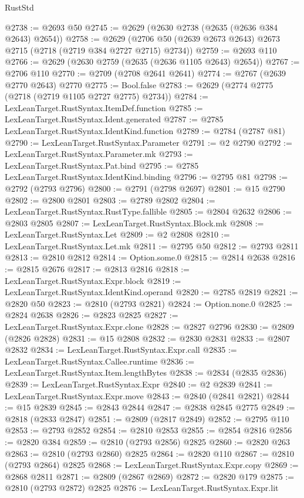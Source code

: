 \begin{lexlean}{RustStd}
\begin{coremodule}
{\begin{coremodule}
{{{{{{{{{{{{{{{{{{{{{{{{{{{{{{{{{@2738 := @2693 @50
@2745 := @2629 (@2630 @2738 (@2635 (@2636 @384 @2643) @2654))
@2758 := @2629 (@2706 @50 (@2639 @2673 @2643) @2673 @2715 (@2718 (@2719 @384 @2727 @2715) @2734))
@2759 := @2693 @110
@2766 := @2629 (@2630 @2759 (@2635 (@2636 @1105 @2643) @2654))
@2767 := @2706 @110
@2770 := @2709 (@2708 @2641 @2641)
@2774 := @2767 (@2639 @2770 @2643) @2770
@2775 := Bool.false
@2783 := @2629 (@2774 @2775 (@2718 (@2719 @1105 @2727 @2775) @2734))
@2784 := LexLeanTarget.RustSyntax.ItemDef.function
@2785 := LexLeanTarget.RustSyntax.Ident.generated
@2787 := @2785 LexLeanTarget.RustSyntax.IdentKind.function
@2789 := @2784 (@2787 @81)
@2790 := LexLeanTarget.RustSyntax.Parameter
@2791 := @2 @2790
@2792 := LexLeanTarget.RustSyntax.Parameter.mk
@2793 := LexLeanTarget.RustSyntax.Pat.bind
@2795 := @2785 LexLeanTarget.RustSyntax.IdentKind.binding
@2796 := @2795 @81
@2798 := @2792 (@2793 @2796)
@2800 := @2791 (@2798 @2697)
@2801 := @15 @2790
@2802 := @2800 @2801
@2803 := @2789 @2802
@2804 := LexLeanTarget.RustSyntax.RustType.fallible
@2805 := @2804 @2632
@2806 := @2803 @2805
@2807 := LexLeanTarget.RustSyntax.Block.mk
@2808 := LexLeanTarget.RustSyntax.Let
@2809 := @2 @2808
@2810 := LexLeanTarget.RustSyntax.Let.mk
@2811 := @2795 @50
@2812 := @2793 @2811
@2813 := @2810 @2812
@2814 := Option.some.{0}
@2815 := @2814 @2638
@2816 := @2815 @2676
@2817 := @2813 @2816
@2818 := LexLeanTarget.RustSyntax.Expr.block
@2819 := LexLeanTarget.RustSyntax.IdentKind.operand
@2820 := @2785 @2819
@2821 := @2820 @50
@2823 := @2810 (@2793 @2821)
@2824 := Option.none.{0}
@2825 := @2824 @2638
@2826 := @2823 @2825
@2827 := LexLeanTarget.RustSyntax.Expr.clone
@2828 := @2827 @2796
@2830 := @2809 (@2826 @2828)
@2831 := @15 @2808
@2832 := @2830 @2831
@2833 := @2807 @2832
@2834 := LexLeanTarget.RustSyntax.Expr.call
@2835 := LexLeanTarget.RustSyntax.Callee.runtime
@2836 := LexLeanTarget.RustSyntax.Item.lengthBytes
@2838 := @2834 (@2835 @2836)
@2839 := LexLeanTarget.RustSyntax.Expr
@2840 := @2 @2839
@2841 := LexLeanTarget.RustSyntax.Expr.move
@2843 := @2840 (@2841 @2821)
@2844 := @15 @2839
@2845 := @2843 @2844
@2847 := @2838 @2845 @2775
@2849 := @2818 (@2833 @2847)
@2851 := @2809 (@2817 @2849)
@2852 := @2795 @110
@2853 := @2793 @2852
@2854 := @2810 @2853
@2855 := @2854 @2816
@2856 := @2820 @384
@2859 := @2810 (@2793 @2856) @2825
@2860 := @2820 @263
@2863 := @2810 (@2793 @2860) @2825
@2864 := @2820 @110
@2867 := @2810 (@2793 @2864) @2825
@2868 := LexLeanTarget.RustSyntax.Expr.copy
@2869 := @2868 @2811
@2871 := @2809 (@2867 @2869)
@2872 := @2820 @179
@2875 := @2810 (@2793 @2872) @2825
@2876 := LexLeanTarget.RustSyntax.Expr.lit
}}}}}}}}}}}}}}}}}}}}}}}}}}}}}}}}}
\end{coremodule}}
\end{coremodule}
\end{lexlean}
